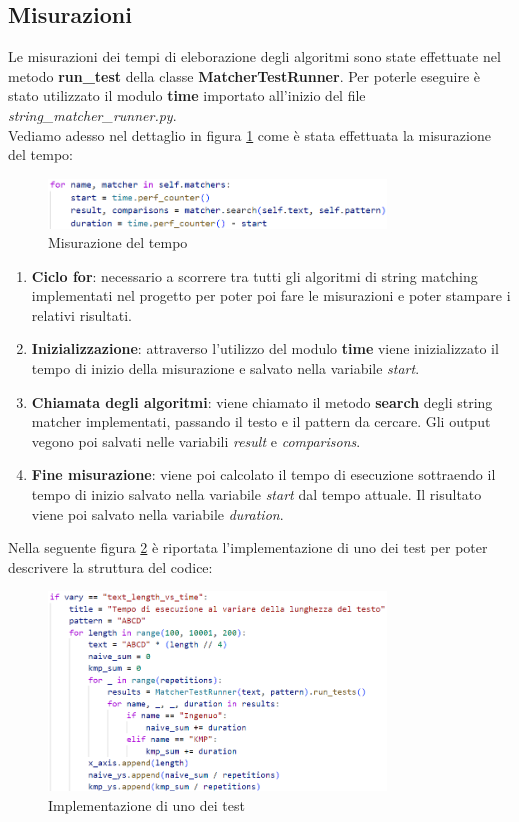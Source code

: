 \documentclass{article}
\begin{document}
\subsection{Misurazioni}
Le misurazioni dei tempi di eleborazione degli algoritmi sono state effettuate nel metodo \textbf{run\_test} della classe \textbf{MatcherTestRunner}. Per poterle eseguire è stato utilizzato il modulo \textbf{time} importato all'inizio del file \textit{string\_matcher\_runner.py}.\\
Vediamo adesso nel dettaglio in figura \ref{fig:time-measurement} come è stata effettuata la misurazione del tempo:
\begin{figure}[H]
    \centering
    \includegraphics[width=0.8\textwidth]{img/Tempo.png}
    \caption{Misurazione del tempo}
    \label{fig:time-measurement}
\end{figure}
\begin{enumerate}
    \item \textbf{Ciclo for}: necessario a scorrere tra tutti gli algoritmi di string matching implementati nel progetto per poter poi fare le misurazioni e poter stampare i relativi risultati.
    \item \textbf{Inizializzazione}: attraverso l'utilizzo del modulo \textbf{time} viene inizializzato il tempo di inizio della misurazione e salvato nella variabile \textit{start}.
    \item \textbf{Chiamata degli algoritmi}: viene chiamato il metodo \textbf{search} degli string matcher implementati, passando il testo e il pattern da cercare. Gli output vegono poi salvati nelle variabili \textit{result} e \textit{comparisons}.
    \item \textbf{Fine misurazione}: viene poi calcolato il tempo di esecuzione sottraendo il tempo di inizio salvato nella variabile \textit{start} dal tempo attuale. Il risultato viene poi salvato nella variabile \textit{duration}.
\end{enumerate}
Nella seguente figura \ref{fig:test-implementation} è riportata l'implementazione di uno dei test per poter descrivere la struttura del codice:
\begin{figure}[H]
    \centering
    \includegraphics[width=0.8\textwidth]{img/Test.png}
    \caption{Implementazione di uno dei test}
    \label{fig:test-implementation}
\end{figure}
\end{document}

